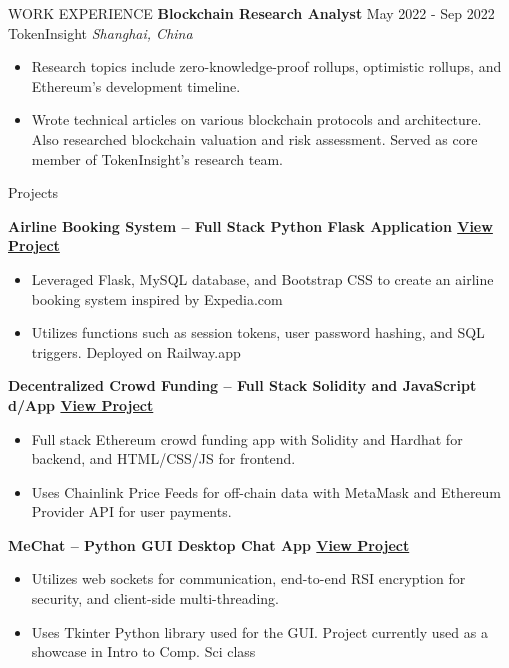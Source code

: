 \documentclass{cv} %
\begin{document}
\begin{rSection}{WORK EXPERIENCE}
	\textbf{Blockchain Research Analyst} \hfill May 2022 - Sep 2022 \\
	TokenInsight \hfill \textit{Shanghai, China}
	\begin{itemize}
		\item Research topics include zero-knowledge-proof rollups, optimistic rollups, and Ethereum’s development timeline.
		\item Wrote technical articles on various blockchain protocols and architecture. Also researched blockchain valuation and risk assessment. Served as core member of TokenInsight’s research team.
	\end{itemize}

\end{rSection}

\begin{rSection}{Projects}

	\textbf{Airline Booking System – Full Stack Python Flask Application \href{https://github.com/larry-lime/airline-ticket-system}{View Project}}
	\begin{itemize}
		\item Leveraged Flask, MySQL database, and Bootstrap CSS to create an airline booking system inspired by Expedia.com
		\item Utilizes functions such as session tokens, user password hashing, and SQL triggers. Deployed on Railway.app
	\end{itemize}

	\textbf{Decentralized Crowd Funding – Full Stack Solidity and JavaScript d/App \href{https://lawrencelim.xyz/project/hh-fund-me/}{View Project}}
	\begin{itemize}
		\item Full stack Ethereum crowd funding app with Solidity and Hardhat for backend, and HTML/CSS/JS for frontend.
		\item Uses Chainlink Price Feeds for off-chain data with MetaMask and Ethereum Provider API for user payments.
	\end{itemize}

	\textbf{MeChat – Python GUI Desktop Chat App \href{https://lawrencelim.xyz/project/mechat/}{View Project}}
	\begin{itemize}
		\item Utilizes web sockets for communication, end-to-end RSI encryption for security, and client-side multi-threading.
		\item Uses Tkinter Python library used for the GUI. Project currently used as a showcase in Intro to Comp. Sci class
	\end{itemize}

\end{rSection}
\end{document}
